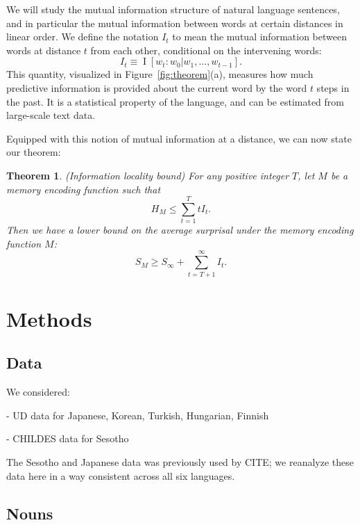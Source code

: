 \documentclass[11pt,letterpaper]{article}
\newcounter{theorem}
\newtheorem{thm}[theorem]{Theorem}
\begin{document}
We will study the mutual information structure of natural language sentences, and in particular the mutual information between words at certain distances in linear order. We define the notation $I_t$ to mean the mutual information between words at distance $t$ from each other, conditional on the intervening words:
\begin{equation*}
    I_t \equiv \operatorname{I}[w_t : w_0 | w_1, \dots, w_{t-1}].
\end{equation*}
This quantity, visualized in Figure~\ref{fig:theorem}(a), measures how much predictive information is provided about the current word by the word $t$ steps in the past.
It is a statistical property of the language, and can be estimated from large-scale text data.

Equipped with this notion of mutual information at a distance, we can now state our theorem:
\begin{thm}\label{prop:suboptimal}(Information locality bound)
For any positive integer $T$, let $M$ be a memory encoding function such that
\begin{equation}
\label{eq:memory-bound}
H_M \le \sum_{t=1}^T t I_t.    
\end{equation}
Then we have a lower bound on the average surprisal under the memory encoding function $M$:
\begin{equation}
\label{eq:surprisal-bound}
S_M \ge S_\infty + \sum_{t=T+1}^\infty I_t.
\end{equation}
\end{thm}
\section{Methods}

\subsection{Data} %
We considered:

- UD data for Japanese, Korean, Turkish, Hungarian, Finnish

- CHILDES data for Sesotho

The Sesotho and Japanese data was previously used by CITE; we reanalyze these data here in a way consistent across all six languages.


\subsection{Nouns}
\end{document}
